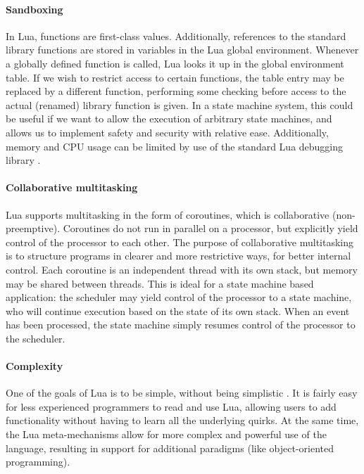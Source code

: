 \paragraph{Sandboxing}
In Lua, functions are first-class values. Additionally, references to the standard library functions are stored in variables in the Lua global environment. Whenever a globally defined function is called, Lua looks it up in the global environment table. If we wish to restrict access to certain functions, the table entry may be replaced by a different function, performing some checking before access to the actual (renamed) library function is given. In a state machine system, this could be useful if we want to allow the execution of arbitrary state machines, and allows us to implement safety and security with relative ease. Additionally, memory and CPU usage can be limited by use of the standard Lua debugging library \cite[ch. 6.10]{manual:lua_reference_manual}.

\paragraph{Collaborative multitasking}
Lua supports multitasking in the form of coroutines, which is collaborative (non-preemptive). Coroutines do not run in parallel on a processor, but explicitly yield control of the processor to each other. The purpose of collaborative multitasking is to structure programs in clearer and more restrictive ways, for better internal control. Each coroutine is an independent thread with its own stack, but memory may be shared between threads. This is ideal for a state machine based application: the scheduler may yield control of the processor to a state machine, who will continue execution based on the state of its own stack. When an event has been processed, the state machine simply resumes control of the processor to the scheduler.

\paragraph{Complexity}
One of the goals of Lua is to be simple, without being simplistic \cite{article:the_implementation_of_lua}. It is fairly easy for less experienced programmers to read and use Lua, allowing users to add functionality without having to learn all the underlying quirks. At the same time, the Lua meta-mechanisms allow for more complex and powerful use of the language, resulting in support for additional paradigms (like object-oriented programming).

